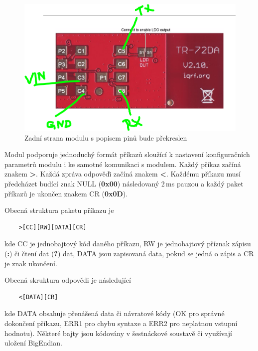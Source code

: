  \begin{figure}[!h]
  \begin{center}
    \includegraphics[scale=0.4]{obrazky/modul_zada}
  \end{center}
  \caption{Zadní strana modulu s popisem pinů \colorbox[rgb]{0,1,0}{bude překreslen}}
\end{figure}

Modul podporuje jednoduchý formát příkazů sloužící k nastavení konfiguračních parametrů modulu i ke samotné komunikaci s modulem. Každý příkaz začíná znakem \textbf{\textgreater}. Každá zpráva odpověďi začíná znakem \textbf{\textless}. Každému příkazu musí předcházet budící znak NULL (\textbf{0x00}) následovaný 2\,ms pauzou a každý paket příkazů je ukončen znakem CR (\textbf{0x0D}). 

Obecná struktura\cite{iqrfmodul} paketu příkazu je 

\begin{verbatim}
	>[CC][RW][DATA][CR]
\end{verbatim}

kde CC je jednobajtový kód daného příkazu, RW je jednobajtový příznak zápisu (\textbf{:}) či čtení dat (\textbf{?}) dat, DATA jsou zapisovaná data, pokud se jedná o zápis a CR je znak ukončení.

Obecná skruktura odpovědi je následující

\begin{verbatim}
	<[DATA][CR]
\end{verbatim}

kde DATA obsahuje přenášená data či návratové kódy (OK pro správné dokončení příkazu, ERR1 pro chybu syntaxe a ERR2 pro neplatnou vstupní hodnotu). Některé bajty jsou kódovány v šestnáckové soustavě či využívají uložení BigEndian.

